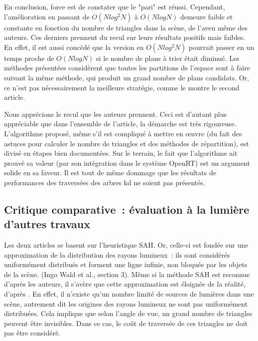 \documentclass[a4paper]{article}
\begin{document}
En conclusion, force est de constater que le "pari" est réussi. Cependant, l'amélioration en passant de $O(Nlog^2N)$ à $O(NlogN)$ demeure faible et constante en fonction du nombre de triangles dans la scène, de l'aveu même des auteurs. Ces derniers prennent du recul sur leurs résultats positifs mais faibles. En effet, il est aussi concédé que la version en $O(Nlog^2N)$ pourrait passer en un temps proche de $O(NlogN)$ si le nombre de plans à trier était diminué. Les méthodes présentées considèrent que toutes les partitions de l'espace sont à faire suivant la même méthode, qui produit un grand nombre de plans candidats. Or, ce n'est pas nécessairement la meilleure stratégie, comme le montre le second article.

Nous apprécions le recul que les auteurs prennent. Ceci est d'autant plus appréciable que dans l'ensemble de l'article, la démarche est très rigoureuse. L'algorithme proposé, même s'il est compliqué à mettre en œuvre (du fait des astuces pour calculer le nombre de triangles et des méthodes de répartition), est divisé en étapes bien documentées. Sur le terrain, le fait que l'algorithme ait prouvé sa valeur (par son intégration dans le système OpenRT) est un argument solide en sa faveur. Il est tout de même dommage que les résultats de performances des traversées des arbres kd ne soient pas présentés.

\subsection{Critique comparative~: évaluation à la lumière d'autres travaux}

Les deux articles se basent sur l'heuristique SAH. Or, celle-ci est fondée sur une approximation de la distribution des rayons lumineux~: ils sont considérés uniformément distribués et forment une ligne infinie, non bloquée par les objets de la scène. (Ingo Wald et al., section 3). Même si la méthode SAH est reconnue d'après les auteurs, il s'avère que cette approximation est éloignée de la réalité, d'après \cite{anti-sah}. En effet, il n'existe qu'un nombre limité de sources de lumières dans une scène, autrement dit les origines des rayons lumineux ne sont pas uniformément distribuées. Cela implique que selon l'angle de vue, un grand nombre de triangles peuvent être invisibles. Dans ce cas, le coût de traversée de ces triangles ne doit pas être considéré.
\end{document}
